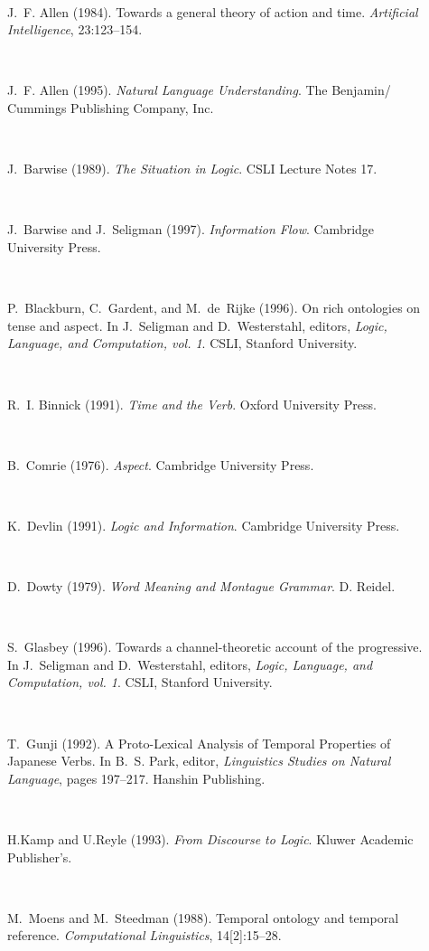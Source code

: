 \begin{description}
\item[~]
J.~F. Allen (1984).
Towards a general theory of action and time.
{\em Artificial Intelligence}, 23:123--154.

\item[~]
J.~F. Allen (1995).
{\em Natural Language Understanding}.
The Benjamin/ Cummings Publishing Company, Inc.

\item[~]
J.~Barwise (1989).
{\em The Situation in Logic}.
CSLI Lecture Notes 17.

\item[~]
J.~Barwise and J.~Seligman (1997).
{\em Information Flow}.
Cambridge University Press.

\item[~]
P.~Blackburn, C.~Gardent, and M.~de~Rijke (1996).
On rich ontologies on tense and aspect.
In J.~Seligman and D.~Westerstahl, editors, {\em Logic, Language, and
  Computation, vol. 1}. CSLI, Stanford University.

\item[~]
R.~I. Binnick (1991).
{\em Time and the Verb}.
Oxford University Press.

\item[~]
B.~Comrie (1976).
{\em Aspect}.
Cambridge University Press.

\item[~]
K.~Devlin (1991).
{\em Logic and Information}.
Cambridge University Press.

\item[~]
D.~Dowty (1979).
{\em Word Meaning and Montague Grammar}.
D. Reidel.

\item[~]
S.~Glasbey (1996).
Towards a channel-theoretic account of the progressive.
In J.~Seligman and D.~Westerstahl, editors, {\em Logic, Language, and
  Computation, vol. 1}. CSLI, Stanford University.

\item[~]
T.~Gunji (1992).
{A Proto-Lexical Analysis of Temporal Properties of {J}apanese
  Verbs}.
In B.~S. Park, editor, {\em {Linguistics Studies on Natural
  Language}}, pages 197--217. Hanshin Publishing.

\item[~]
H.Kamp and U.Reyle (1993).
{\em From Discourse to Logic}.
Kluwer Academic Publisher's.

\item[~]
M.~Moens and M.~Steedman (1988).
Temporal ontology and temporal reference.
{\em Computational Linguistics}, 14[2]:15--28.


\end{description}
